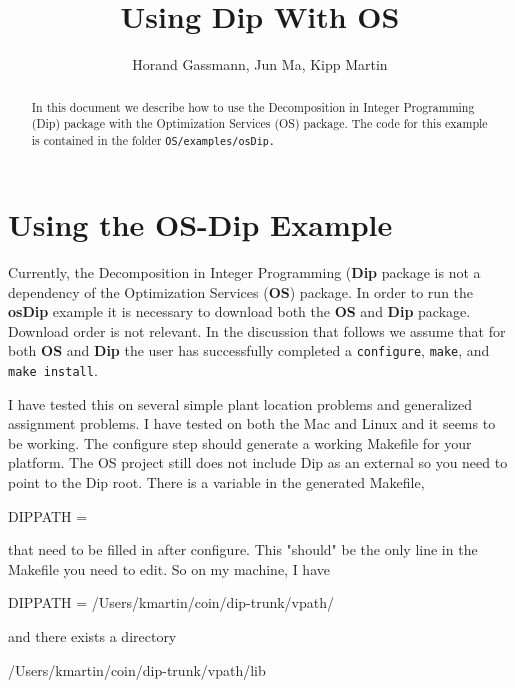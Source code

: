 \documentclass[11pt]{article}
\renewcommand{\_}{{\char"5F}}
\renewcommand{\{}{{\char"7B}}
\renewcommand{\}}{{\char"7D}}
\renewcommand{\^}{{\char"0D}}
\renewcommand{\'}{{\char"0D}}
\begin{document}
\title{Using Dip With OS}
\vskip 2in
\author{Horand Gassmann, Jun Ma,  Kipp Martin}
\maketitle

\begin{abstract}
In this document we describe how to use the Decomposition in Integer Programming
(Dip) package with the Optimization Services (OS) package.  The code for this example is contained in the folder {\tt  OS/examples/osDip.}

\end{abstract}


\newpage
{}


 

\newpage

\section{Using the OS-Dip Example}

Currently, the Decomposition in Integer Programming ({\bf Dip} package is not a dependency of the Optimization Services ({\bf OS}) package.  In order to run the {\bf osDip} example it is necessary to download both the {\bf OS} and {\bf  Dip} package. Download order is not relevant. In the discussion that follows we assume that for both {\bf OS} and {\bf Dip} the user has successfully completed a {\tt configure}, {\tt make}, and {\tt make install}.



I have tested this on several simple plant location problems and generalized
assignment problems. I have tested on both the Mac and Linux and it seems to be
working. The configure step should generate a working Makefile for your platform.
The OS project still does not include Dip as an external so you need to point to
the Dip root. There is a variable in the generated Makefile,

DIPPATH =

that need to be filled in after configure. This "should" be the only line in the
Makefile you need to edit. So on my machine, I have

DIPPATH = /Users/kmartin/coin/dip-trunk/vpath/

and there exists a directory

/Users/kmartin/coin/dip-trunk/vpath/lib
\end{document}
